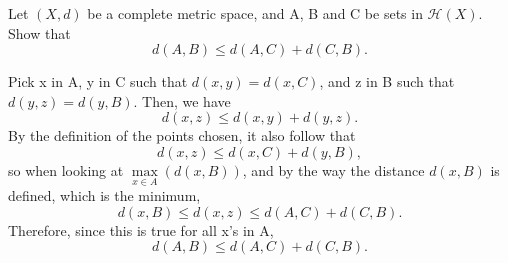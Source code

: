\documentclass[../fractals_everywhere.tex]{subfiles}
\begin{document}
\begin{exr}
	Let \((X, d)\) be a complete metric space, and A, B and C be sets in \(\mathcal{H}(X)\). Show that
	\[
		d(A, B) \leq d(A, C) + d(C, B).
	\]

	Pick x in A, y in C such that \(d(x, y) = d(x, C)\), and z in B such that \(d(y, z) = d(y, B)\).
	Then, we have
	\[
		d(x, z)\leq d(x, y) + d(y, z).
	\]
	By the definition of the points chosen, it also follow that
	\[
		d(x, z) \leq d(x, C) + d(y, B),
	\]
	so when looking at \(\max\limits_{x\in A}(d(x, B))\), and by the way the distance \(d(x, B)\) is defined, which is the minimum,
	\[
		d(x, B)\leq d(x, z)\leq d(A, C) + d(C, B).
	\]
	Therefore, since this is true for all x's in A,
	\[
		d(A, B)\leq d(A, C) + d(C, B).
	\]

\end{exr}
\end{document}
